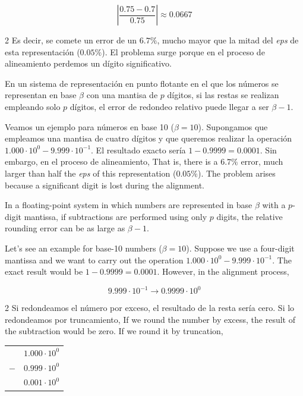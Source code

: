 \begin{equation*}
\left\vert\frac{0.75-0.7}{0.75}\right\vert\approx 0.0667
\end{equation*}
\begin{paracol}{2}
Es decir, se comete un error de un $6.7\%$, mucho mayor que la mitad del \emph{eps} de esta representación ($0.05\%$). El problema surge porque en el proceso de alineamiento perdemos un dígito significativo.

En un sistema de representación en punto flotante en el que los números se representan en base $\beta$ con una mantisa de $p$ dígitos, si las restas se realizan empleando solo $p$ dígitos, el error de redondeo relativo puede llegar a ser $\beta-1$.

Veamos un ejemplo para números en base 10 ($\beta=10$). Supongamos que empleamos una mantisa de cuatro dígitos y que queremos realizar la operación $1.000\cdot10^0-9.999\cdot10^{-1}$. El resultado exacto sería $1-0.9999=0.0001$. Sin embargo, en el proceso de alineamiento,
\switchcolumn
That is, there is a $6.7\%$ error, much larger than half the \emph{eps} of this representation ($0.05\%$). The problem arises because a significant digit is lost during the alignment.

In a floating-point system in which numbers are represented in base $\beta$ with a $p$-digit mantissa, if subtractions are performed using only $p$ digits, the relative rounding error can be as large as $\beta-1$.

Let's see an example for base-10 numbers ($\beta=10$). Suppose we use a four-digit mantissa and we want to carry out the operation $1.000\cdot10^0-9.999\cdot10^{-1}$. The exact result would be $1-0.9999=0.0001$. However, in the alignment process,
\end{paracol}

\begin{equation*}
9.999\cdot10^{-1}\rightarrow0.9999\cdot10^0
\end{equation*}
\begin{paracol}{2}
Si redondeamos el número por exceso, el resultado de la resta sería cero. Si lo redondeamos por truncamiento,
\switchcolumn
If we round the number by excess, the result of the subtraction would be zero. If we round it by truncation,
\end{paracol}
\begin{center}
\begin{tabular}{c r}
&$1.000\cdot10^0$\\
$-$&$0.999\cdot10^0$\\
\hline
&$0.001\cdot10^0$
\end{tabular}
\end{center}

